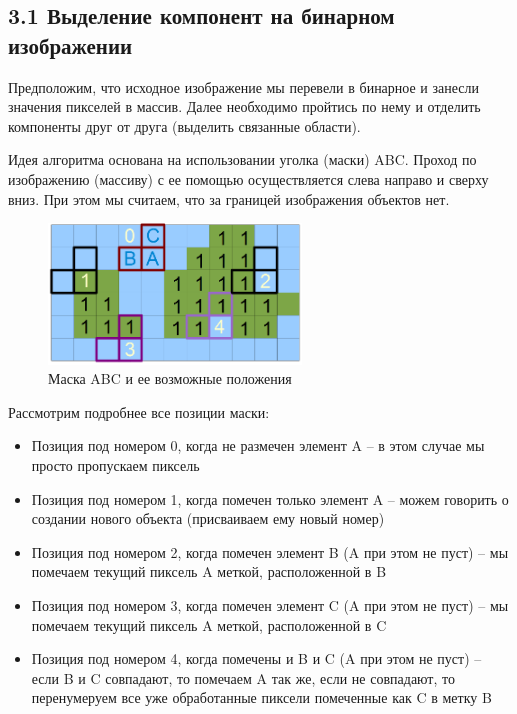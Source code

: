 \documentclass{report}
\begin{document}
\subsection*{3.1 Выделение компонент на бинарном изображении}
\par Предположим, что исходное изображение мы перевели в бинарное и занесли значения пикселей в массив. Далее необходимо пройтись по нему и отделить компоненты друг от друга (выделить связанные области). 
\par Идея алгоритма основана на использовании уголка (маски) ABC. Проход по изображению (массиву) с ее помощью осуществляется слева направо и сверху вниз. При этом мы считаем, что за границей изображения объектов нет.
\begin{figure}[htbp]
  \centering
  \includegraphics[width=0.6\textwidth]{3ABC.png}
  \caption{Маска ABC и ее возможные положения}\label{fig:3ABC.png}
\end{figure}
\par Рассмотрим подробнее все позиции маски:
\begin{itemize}
\item Позиция под номером 0, когда не размечен элемент A – в этом случае мы просто пропускаем пиксель
\item Позиция под номером 1, когда помечен только элемент A – можем говорить о создании нового объекта (присваиваем ему новый номер)
\item Позиция под номером 2, когда помечен элемент B (A при этом не пуст) – мы помечаем текущий пиксель A меткой, расположенной в B
\item Позиция под номером 3, когда помечен элемент C (A при этом не пуст) – мы помечаем текущий пиксель A меткой, расположенной в C
\item Позиция под номером 4, когда помечены и B и C (A при этом не пуст) – если B и C совпадают, то помечаем A так же, если не совпадают, то перенумеруем все уже обработанные пиксели помеченные как C в метку B
\end{itemize}
\end{document}
